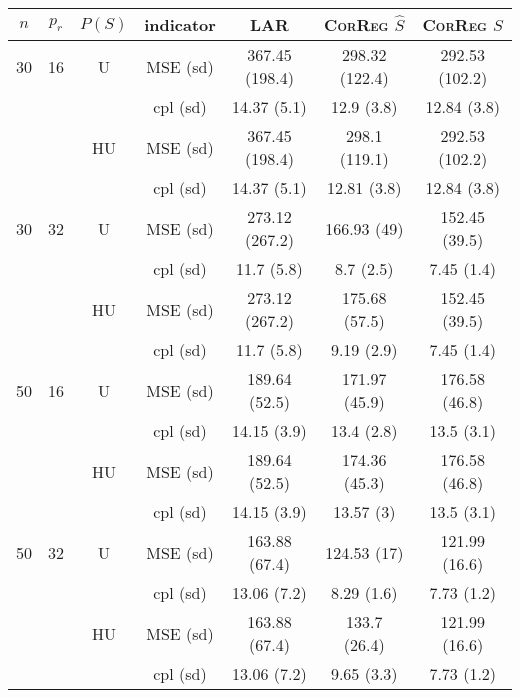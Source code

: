 \documentclass[11pt,a4paper]{article}
\begin{document}
\begin{table}[h!]
\centering
\begin{tabular}{|c|c|c|c|c|c|c|}
\hline 
$n$ & $p_r$&  $P(S)$ &indicator &LAR  &    \textsc{CorReg} $\hat S$& \textsc{CorReg} $S$\\ 
\hline %
30 & 16 & U&MSE (sd) & 367.45 (198.4) & 298.32 (122.4) & 292.53 (102.2) \\
& & & cpl (sd) & 14.37 (5.1) & 12.9 (3.8) & 12.84 (3.8) \\
 &  &HU &MSE (sd) & 367.45 (198.4) & 298.1 (119.1) & 292.53 (102.2) \\
& & & cpl (sd) & 14.37 (5.1) & 12.81 (3.8) & 12.84 (3.8) \\
\hline %
30 & 32 & U & MSE (sd) & 273.12 (267.2) & 166.93 (49) & 152.45 (39.5) \\
& & & cpl (sd) & 11.7 (5.8) & 8.7 (2.5) & 7.45 (1.4) \\
 &  & HU & MSE (sd) & 273.12 (267.2) & 175.68 (57.5) & 152.45 (39.5) \\
& & & cpl (sd) & 11.7 (5.8) & 9.19 (2.9) & 7.45 (1.4) \\
\hline
\hline %
50 & 16 & U&	MSE (sd) & 189.64 (52.5) & 171.97 (45.9) & 176.58 (46.8) \\
& & & cpl (sd) & 14.15 (3.9) & 13.4 (2.8) & 13.5 (3.1) \\
 &  &HU &MSE (sd) & 189.64 (52.5) & 174.36 (45.3) & 176.58 (46.8) \\
& & & cpl (sd) & 14.15 (3.9) & 13.57 (3) & 13.5 (3.1) \\
\hline %
50 & 32 & U&MSE (sd) & 163.88 (67.4) & 124.53 (17) & 121.99 (16.6) \\
& & & cpl (sd) & 13.06 (7.2) & 8.29 (1.6) & 7.73 (1.2) \\
 &  &HU &MSE (sd) & 163.88 (67.4) & 133.7 (26.4) & 121.99 (16.6) \\
& & &cpl (sd) & 13.06 (7.2) & 9.65 (3.3) & 7.73 (1.2) \\

\end{tabular}
\end{table}
\end{document}
